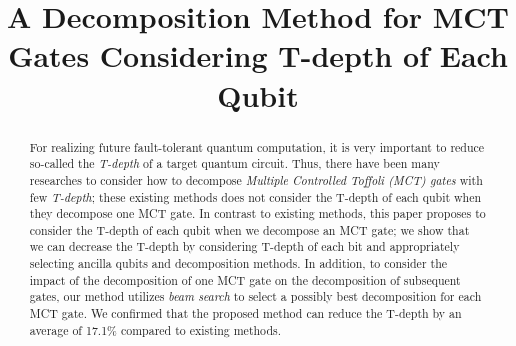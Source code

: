 \documentclass[conference]{IEEEtran}
\begin{document}
\title{A Decomposition Method for MCT Gates Considering T-depth of Each Qubit}



\maketitle

\begin{abstract}
  For realizing future fault-tolerant quantum computation, it is very
  important to reduce so-called the {\it T-depth} of a target quantum
  circuit. Thus, there have been many researches to consider how to
  decompose {\it Multiple Controlled Toffoli (MCT) gates} with few
  {\it T-depth}; these existing methods does not consider the T-depth
  of each qubit when they decompose one MCT gate. In contrast to
  existing methods, this paper proposes to consider the T-depth
  of each qubit when we decompose an MCT gate; we show
  that we can decrease the T-depth by considering T-depth of each bit
  and appropriately selecting ancilla qubits and decomposition
  methods. In addition, to consider the impact of the decomposition of
  one MCT gate on the decomposition of subsequent gates, our method
  utilizes {\it beam search} to select  
  a possibly best decomposition for each MCT gate. 
  We confirmed that the proposed method can reduce the T-depth by an average of 17.1\%
  compared to existing methods. 
\end{abstract}
\end{document}

